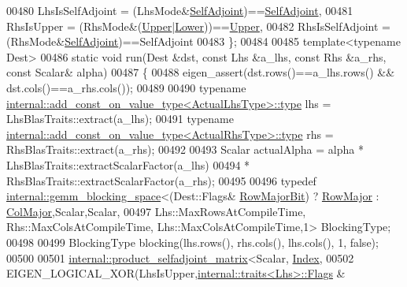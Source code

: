 \begin{DoxyCode}
00480     LhsIsSelfAdjoint = (LhsMode&\hyperlink{group__enums_gga39e3366ff5554d731e7dc8bb642f83cda2491fc6765056421f504eb7e16083e8f}{SelfAdjoint})==\hyperlink{group__enums_gga39e3366ff5554d731e7dc8bb642f83cda2491fc6765056421f504eb7e16083e8f}{SelfAdjoint},
00481     RhsIsUpper = (RhsMode&(\hyperlink{group__enums_gga39e3366ff5554d731e7dc8bb642f83cda6bcb58be3b8b8ec84859ce0c5ac0aaec}{Upper}|\hyperlink{group__enums_gga39e3366ff5554d731e7dc8bb642f83cda891792b8ed394f7607ab16dd716f60e6}{Lower}))==\hyperlink{group__enums_gga39e3366ff5554d731e7dc8bb642f83cda6bcb58be3b8b8ec84859ce0c5ac0aaec}{Upper},
00482     RhsIsSelfAdjoint = (RhsMode&\hyperlink{group__enums_gga39e3366ff5554d731e7dc8bb642f83cda2491fc6765056421f504eb7e16083e8f}{SelfAdjoint})==SelfAdjoint
00483   \};
00484   
00485   \textcolor{keyword}{template}<\textcolor{keyword}{typename} Dest>
00486   \textcolor{keyword}{static} \textcolor{keywordtype}{void} run(Dest &dst, \textcolor{keyword}{const} Lhs &a\_lhs, \textcolor{keyword}{const} Rhs &a\_rhs, \textcolor{keyword}{const} Scalar& alpha)
00487   \{
00488     eigen\_assert(dst.rows()==a\_lhs.rows() && dst.cols()==a\_rhs.cols());
00489 
00490     \textcolor{keyword}{typename} \hyperlink{group___sparse_core___module}{internal::add\_const\_on\_value\_type<ActualLhsType>::type}
       lhs = LhsBlasTraits::extract(a\_lhs);
00491     \textcolor{keyword}{typename} \hyperlink{group___sparse_core___module}{internal::add\_const\_on\_value\_type<ActualRhsType>::type}
       rhs = RhsBlasTraits::extract(a\_rhs);
00492 
00493     Scalar actualAlpha = alpha * LhsBlasTraits::extractScalarFactor(a\_lhs)
00494                                * RhsBlasTraits::extractScalarFactor(a\_rhs);
00495 
00496     \textcolor{keyword}{typedef} \hyperlink{class_eigen_1_1internal_1_1gemm__blocking__space}{internal::gemm\_blocking\_space}<(Dest::Flags&
      \hyperlink{group__flags_gae4f56c2a60bbe4bd2e44c5b19cbe8762}{RowMajorBit}) ? \hyperlink{group__enums_ggaacded1a18ae58b0f554751f6cdf9eb13acfcde9cd8677c5f7caf6bd603666aae3}{RowMajor} : \hyperlink{group__enums_ggaacded1a18ae58b0f554751f6cdf9eb13a0cbd4bdd0abcfc0224c5fcb5e4f6669a}{ColMajor},Scalar,Scalar,
00497               Lhs::MaxRowsAtCompileTime, Rhs::MaxColsAtCompileTime, Lhs::MaxColsAtCompileTime,1> 
      BlockingType;
00498 
00499     BlockingType blocking(lhs.rows(), rhs.cols(), lhs.cols(), 1, \textcolor{keyword}{false});
00500 
00501     \hyperlink{struct_eigen_1_1internal_1_1product__selfadjoint__matrix}{internal::product\_selfadjoint\_matrix}<Scalar, 
      \hyperlink{namespace_eigen_a62e77e0933482dafde8fe197d9a2cfde}{Index},
00502       EIGEN\_LOGICAL\_XOR(LhsIsUpper,\hyperlink{struct_eigen_1_1internal_1_1traits}{internal::traits<Lhs>::Flags} &

\end{DoxyCode}
